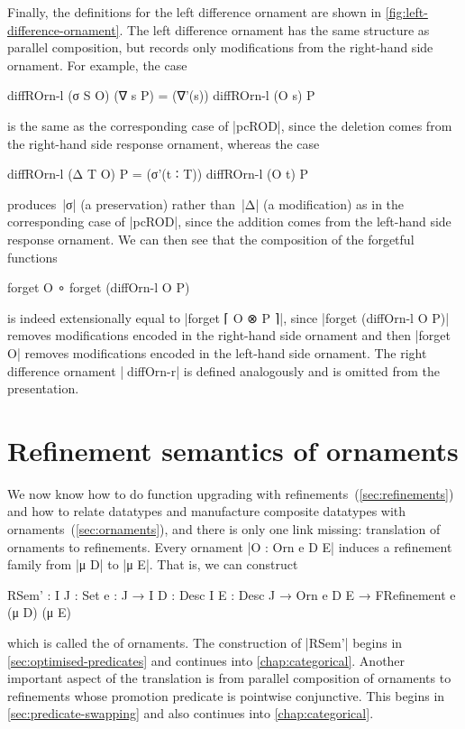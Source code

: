 Finally, the definitions for the left difference ornament are shown in \autoref{fig:left-difference-ornament}.
The left difference ornament has the same structure as parallel composition, but records only modifications from the right-hand side ornament.
For example, the case
\begin{code}
diffROrn-l (σ S O) (∇ s P) = (∇'(s)) diffROrn-l (O s) P
\end{code}
is the same as the corresponding case of |pcROD|, since the deletion comes from the right-hand side response ornament, whereas the case
\begin{code}
diffROrn-l (Δ T O) P = (σ'(t ∶ T)) diffROrn-l (O t) P
\end{code}
produces~|σ| (a preservation) rather than~|Δ| (a modification) as in the corresponding case of |pcROD|, since the addition comes from the left-hand side response ornament.
We can then see that the composition of the forgetful functions
\begin{code}
forget O ∘ forget (diffOrn-l  O P)
\end{code}
is indeed extensionally equal to |forget ⌈ O ⊗ P ⌉|, since |forget (diffOrn-l O P)| removes modifications encoded in the right-hand side ornament and then |forget O| removes modifications encoded in the left-hand side ornament.
The right difference ornament |^^^diffOrn-r| is defined analogously and is omitted from the presentation.

\section{Refinement semantics of ornaments}
\label{sec:refinement-semantics}

We now know how to do function upgrading with refinements~(\autoref{sec:refinements}) and how to relate datatypes and manufacture composite datatypes with ornaments~(\autoref{sec:ornaments}), and there is only one link missing: translation of ornaments to refinements.
Every ornament |O : Orn e D E| induces a refinement family from |μ D| to |μ E|.
That is, we can construct
\begin{code}
RSem' :  {I J : Set} {e : J → I} {D : Desc I} {E : Desc J} →
         Orn e D E → FRefinement e (μ D) (μ E)
\end{code}
which is called the  of ornaments.
The construction of |RSem'| begins in \autoref{sec:optimised-predicates} and continues into \autoref{chap:categorical}.
Another important aspect of the translation is from parallel composition of ornaments to refinements whose promotion predicate is pointwise conjunctive.
This begins in \autoref{sec:predicate-swapping} and also continues into \autoref{chap:categorical}.


